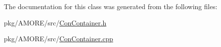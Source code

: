 The documentation for this class was generated from the following files:\begin{DoxyCompactItemize}
\item 
pkg/AMORE/src/\hyperlink{_con_container_8h}{ConContainer.h}\item 
pkg/AMORE/src/\hyperlink{_con_container_8cpp}{ConContainer.cpp}\end{DoxyCompactItemize}
